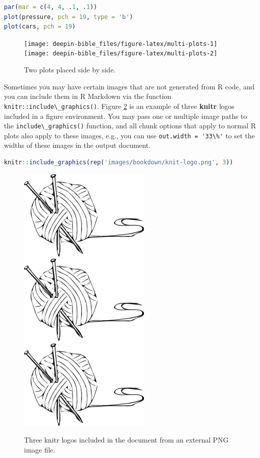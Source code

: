 \documentclass[doctor,openright,twoside]{sjtuthesis}
\newcommand{\passthrough}[1]{#1}
\theoremstyle{plain}
\theoremstyle{definition}
\theoremstyle{remark}
\theoremstyle{ocrenumbox}
\theoremstyle{plain}
\begin{document}
\begin{lstlisting}[language=R]
par(mar = c(4, 4, .1, .1))
plot(pressure, pch = 19, type = 'b')
plot(cars, pch = 19)
\end{lstlisting}

\begin{figure}
\texttt{[image: deepin-bible\_files/figure-latex/multi-plots-1]} \texttt{[image: deepin-bible\_files/figure-latex/multi-plots-2]} \caption[Two plots placed side by side]{Two plots placed side by side.}\label{fig:multi-plots}
\end{figure}

Sometimes you may have certain images that are not generated from R code, and you can include them in R Markdown via the function \passthrough{\lstinline!knitr::include\_graphics()!}. Figure \ref{fig:knitr-logo} is an example of three \textbf{knitr} logos included in a figure environment. You may pass one or multiple image paths to the \passthrough{\lstinline!include\_graphics()!} function, and all chunk options that apply to normal R plots also apply to these images, e.g., you can use \passthrough{\lstinline!out.width = '33\%'!} to set the widths of these images in the output document.

\begin{lstlisting}[language=R]
knitr::include_graphics(rep('images/bookdown/knit-logo.png', 3))
\end{lstlisting}

\begin{figure}
\includegraphics[width=0.328\linewidth]{images/bookdown/knit-logo} \includegraphics[width=0.328\linewidth]{images/bookdown/knit-logo} \includegraphics[width=0.328\linewidth]{images/bookdown/knit-logo} \caption[Three knitr logos included in the document from an external PNG image file]{Three knitr logos included in the document from an external PNG image file.}\label{fig:knitr-logo}
\end{figure}
\end{document}
